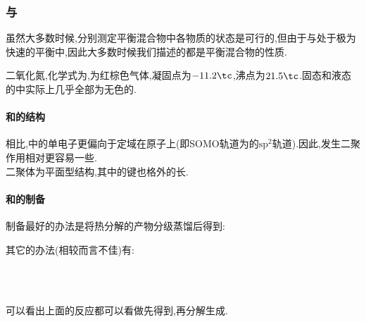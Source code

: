 \documentclass{ctexbook}
\begin{document}
\subsubsection{与}
虽然大多数时候,分别测定平衡混合物中各物质的状态是可行的,但由于与处于极为快速的平衡中,因此大多数时候我们描述的都是平衡混合物的性质.
\begin{substance}[\ce{NO2}]
    二氧化氮,化学式为,为红棕色气体,凝固点为$-11.2\tc$,沸点为$21.5\tc$.固态和液态的中实际上几乎全部为无色的.
\end{substance}
\paragraph{和的结构}
相比,中的单电子更偏向于定域在原子上(即SOMO轨道为的$\text{sp}^2$轨道).因此,发生二聚作用相对更容易一些.\\
\indent 二聚体为平面型结构,其中的键也格外的长.
\paragraph{和的制备}
制备最好的办法是将热分解的产物分级蒸馏后得到:
\begin{center}
\end{center}
其它的办法(相较而言不佳)有:
\begin{center}
    \\
    \\
\end{center}
可以看出上面的反应都可以看做先得到,再分解生成.
\end{document}
